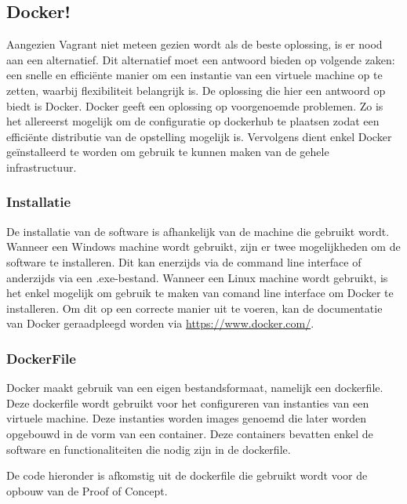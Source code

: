 \subsection{Docker!}
Aangezien Vagrant niet meteen gezien wordt als de beste oplossing, is er nood aan een alternatief. Dit alternatief moet een antwoord bieden op volgende zaken: een snelle en efficiënte manier om een instantie van een virtuele machine op te zetten, waarbij flexibiliteit belangrijk is. De oplossing die hier een antwoord op biedt is Docker. Docker geeft een oplossing op voorgenoemde problemen. Zo is het allereerst mogelijk om de configuratie op dockerhub te plaatsen zodat een efficiënte distributie van de opstelling mogelijk is. Vervolgens dient enkel Docker geïnstalleerd te worden om gebruik te kunnen maken van de gehele infrastructuur. 
\subsubsection{Installatie}
De installatie van de software is afhankelijk van de machine die gebruikt wordt. Wanneer een Windows machine wordt gebruikt, zijn er twee mogelijkheden om de software te installeren. Dit kan enerzijds via de command line interface of anderzijds via een .exe-bestand. Wanneer een Linux machine wordt gebruikt,  is het enkel mogelijk om gebruik te maken van comand line interface om Docker te installeren. Om dit op een correcte manier uit te voeren, kan de documentatie van Docker geraadpleegd worden via \url{ https://www.docker.com/}. \newline

\subsubsection{DockerFile}
\label{subsec:dockerfile}
Docker maakt gebruik van een eigen bestandsformaat, namelijk een dockerfile. Deze dockerfile wordt gebruikt voor het configureren van instanties van een virtuele machine. Deze instanties worden images genoemd die later worden opgebouwd in de vorm van een container. Deze containers bevatten enkel de software en functionaliteiten die nodig zijn in de dockerfile. \newline

De code hieronder is afkomstig uit de dockerfile die gebruikt wordt voor de opbouw van de Proof of Concept. 


